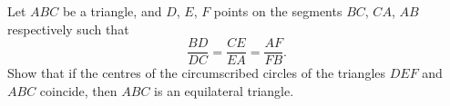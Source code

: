 \documentclass[varwidth]{standalone}
\begin{document}
    Let $ABC$ be a triangle, and $D$, $E$, $F$ points on the segments $BC$, $CA$, $AB$ respectively such that
    \[
        \frac{BD}{DC} = \frac{CE}{EA} = \frac{AF}{FB}.  
    \]
    Show that if the centres of the circumscribed circles of the triangles $DEF$ and $ABC$ coincide, then $ABC$ is an equilateral triangle.
\end{document}
